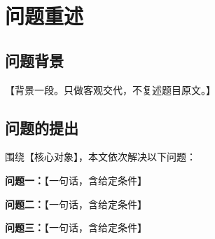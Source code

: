 \section{问题重述}

\subsection{问题背景}

【背景一段。只做客观交代，不复述题目原文。】

\subsection{问题的提出}

围绕【核心对象】，本文依次解决以下问题：

\textbf{问题一：}【一句话，含给定条件】

\textbf{问题二：}【一句话，含给定条件】

\textbf{问题三：}【一句话，含给定条件】
